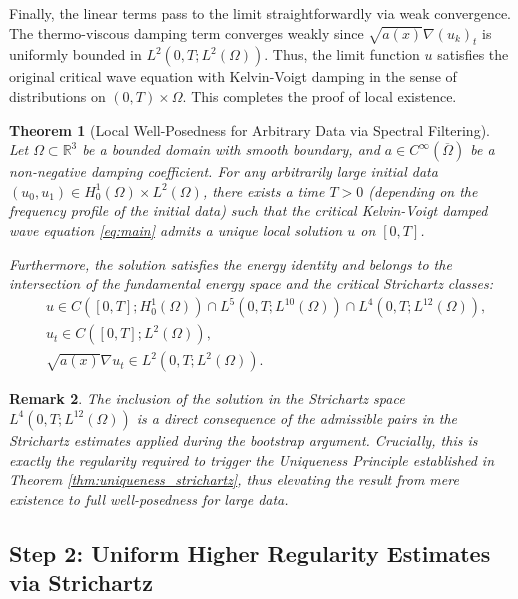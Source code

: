 \documentclass[11pt,letterpaper]{amsart}
\newtheorem{theorem}{Theorem}[section]
\newtheorem{remark}[theorem]{Remark}
\begin{document}
Finally, the linear terms pass to the limit straightforwardly via weak convergence. The thermo-viscous damping term converges weakly since $\sqrt{a(x)}\nabla (u_k)_t$ is uniformly bounded in $L^2(0,T; L^2(\Omega))$. Thus, the limit function $u$ satisfies the original critical wave equation with Kelvin-Voigt damping in the sense of distributions on $(0,T) \times \Omega$. This completes the proof of local existence.



\begin{theorem}[Local Well-Posedness for Arbitrary Data via Spectral Filtering]\label{thm:lwp_arbitrary_data}
Let $\Omega \subset \mathbb{R}^3$ be a bounded domain with smooth boundary, and $a \in C^{\infty}(\overline{\Omega})$ be a non-negative damping coefficient. For any arbitrarily large initial data $(u_0, u_1) \in H_0^1(\Omega) \times L^2(\Omega)$, there exists a time $T > 0$ (depending on the frequency profile of the initial data) such that the critical Kelvin-Voigt damped wave equation \eqref{eq:main} admits a unique local solution $u$ on $[0,T]$.

Furthermore, the solution satisfies the energy identity and belongs to the intersection of the fundamental energy space and the critical Strichartz classes:
\begin{align*}
   & u \in C([0,T]; H_0^1(\Omega)) \cap L^5(0,T; L^{10}(\Omega)) \cap L^4(0,T; L^{12}(\Omega)), \\
   & u_t \in C([0,T]; L^2(\Omega)), \\
   & \sqrt{a(x)}\nabla u_t \in L^2(0,T; L^2(\Omega)).
\end{align*}
\end{theorem}

\begin{remark}
The inclusion of the solution in the Strichartz space\\ $L^4(0,T; L^{12}(\Omega))$ is a direct consequence of the admissible pairs in the Strichartz estimates applied during the bootstrap argument. Crucially, this is exactly the regularity required to trigger the Uniqueness Principle established in Theorem \ref{thm:uniqueness_strichartz}, thus elevating the result from mere existence to full well-posedness for large data.
\end{remark}


\subsection{Step 2: Uniform Higher Regularity Estimates via Strichartz}
\end{document}
